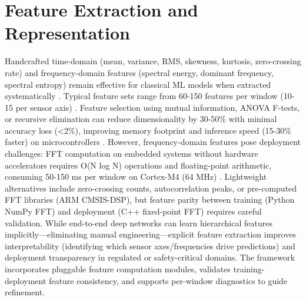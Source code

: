 \section{Feature Extraction and Representation}
Handcrafted time-domain (mean, variance, RMS, skewness, kurtosis, zero-crossing rate) and frequency-domain features (spectral energy, dominant frequency, spectral entropy) remain effective for classical ML models when extracted systematically \cite{oppenheim1999discrete}. Typical feature sets range from 60-150 features per window (10-15 per sensor axis) \cite{wang2024har_comparative}. Feature selection using mutual information, ANOVA F-tests, or recursive elimination can reduce dimensionality by 30-50\% with minimal accuracy loss (<2\%), improving memory footprint and inference speed (15-30\% faster) on microcontrollers \cite{banos2014wisdm}. However, frequency-domain features pose deployment challenges: FFT computation on embedded systems without hardware accelerators requires O(N log N) operations and floating-point arithmetic, consuming 50-150 ms per window on Cortex-M4 (64 MHz) \cite{banbury2021mlperf}. Lightweight alternatives include zero-crossing counts, autocorrelation peaks, or pre-computed FFT libraries (ARM CMSIS-DSP), but feature parity between training (Python NumPy FFT) and deployment (C++ fixed-point FFT) requires careful validation. While end-to-end deep networks can learn hierarchical features implicitly---eliminating manual engineering---explicit feature extraction improves interpretability (identifying which sensor axes/frequencies drive predictions) and deployment transparency in regulated or safety-critical domains. The framework incorporates pluggable feature computation modules, validates training-deployment feature consistency, and supports per-window diagnostics to guide refinement.

